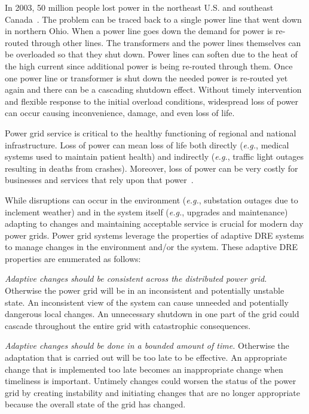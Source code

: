 \documentclass[conference]{IEEEtran}
\begin{document}
In 2003, 50 million people lost power in the northeast U.S. and southeast Canada~\cite{Minkel:08}. The problem can be traced back to a single power line that went down in northern Ohio. When a power line goes down the demand for power is re-routed through other lines. The transformers and the power lines themselves can be overloaded so that they shut down. Power lines can soften due to the heat of the high current since additional power is being re-routed through them. Once one power line or transformer is shut down the needed power is re-routed yet again and there can be a cascading shutdown effect. Without timely intervention and flexible response to the initial overload conditions, widespread loss of power can occur causing inconvenience, damage, and even loss of life.

Power grid service is critical to the healthy functioning of regional and national infrastructure. Loss of power can mean loss of life both directly (\emph{e.g.}, medical systems used to maintain patient health) and indirectly (\emph{e.g.}, traffic light outages resulting in deaths from crashes). Moreover, loss of power can be very costly for businesses and services that rely upon that power~\cite{Chen:10}.

While disruptions can occur in the environment (\emph{e.g.}, substation outages due to inclement weather) and in the system itself (\emph{e.g.}, upgrades and maintenance) adapting to changes and maintaining acceptable service is crucial for modern day power grids. Power grid systems leverage the properties of adaptive DRE systems to manage changes in the environment and/or the system. These adaptive DRE properties are enumerated as follows:

\emph{Adaptive changes should be consistent across the distributed power grid.} Otherwise the power grid will be in an inconsistent and potentially unstable state. An inconsistent view of the system can cause unneeded and potentially dangerous local changes. An unnecessary shutdown in one part of the grid could cascade throughout the entire grid with catastrophic consequences.

\emph{Adaptive changes should be done in a bounded amount of time.} Otherwise the adaptation that is carried out will be too late to be effective. An appropriate change that is implemented too late becomes an inappropriate change when timeliness is important. Untimely changes could worsen the status of the power grid by creating instability and initiating changes that are no longer appropriate because the overall state of the grid has changed.
\end{document}
